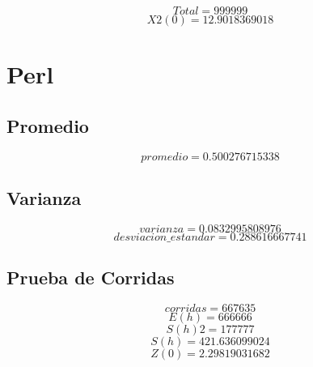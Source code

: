 \documentclass{article}
\begin{document}
$$
Total = 999999
$$
$$
X2(0) = 12.9018369018
$$
\section{Perl}


\subsection{Promedio}
$$
promedio = 0.500276715338
$$


\subsection{Varianza}
$$
varianza = 0.0832995808976
$$
$$
desviacion\_estandar = 0.288616667741
$$


\subsection{Prueba de Corridas}
$$
corridas = 667635
$$
$$
E(h) = 666666
$$
$$
S(h)2 = 177777
$$
$$
S(h) = 421.636099024
$$
$$
Z(0) = 2.29819031682
$$
\end{document}
